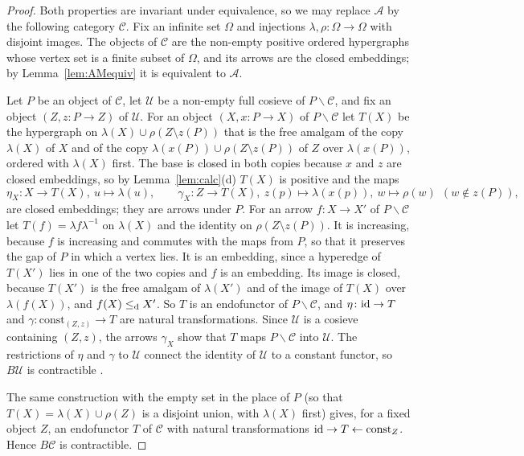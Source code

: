 \begin{proof}
Both properties are invariant under equivalence, so we may replace $\mathcal A$
by the following category $\mathcal C$. Fix an infinite set $\Omega$ and
injections $\lambda,\rho\colon\Omega\to\Omega$ with disjoint images. The objects
of $\mathcal C$ are the non-empty positive ordered hypergraphs whose vertex set
is a finite subset of $\Omega$, and its arrows are the closed embeddings; by
Lemma~\ref{lem:AMequiv} it is equivalent to $\mathcal A$.

Let $P$ be an object of $\mathcal C$, let $\mathcal U$ be a non-empty full
cosieve of $P\backslash\mathcal C$, and fix an object $(Z,z\colon P\to Z)$ of
$\mathcal U$. For an object $(X,x\colon P\to X)$ of $P\backslash\mathcal C$ let
$T(X)$ be the hypergraph on $\lambda(X)\cup\rho(Z\setminus z(P))$ that is the free
amalgam of the copy $\lambda(X)$ of $X$ and of the copy
$\lambda(x(P))\cup\rho(Z\setminus z(P))$ of $Z$ over $\lambda(x(P))$, ordered
with $\lambda(X)$ first. The base is closed in both copies because $x$ and
$z$ are closed embeddings, so by Lemma~\ref{lem:calc}(d) $T(X)$ is positive and
the maps
\[
 \eta_X\colon X\to T(X),\ u\mapsto\lambda(u),\qquad
 \gamma_X\colon Z\to T(X),\ z(p)\mapsto\lambda(x(p)),\ w\mapsto\rho(w)\ \
 (w\notin z(P)),
\]
are closed embeddings; they are arrows under $P$. For an arrow
$f\colon X\to X'$ of $P\backslash\mathcal C$ let
$T(f)=\lambda f\lambda^{-1}$ on $\lambda(X)$ and the identity on
$\rho(Z\setminus z(P))$. It is increasing, because $f$ is increasing and
commutes with the maps from $P$, so that it preserves the gap of $P$ in which a
vertex lies. It is an embedding, since a hyperedge of $T(X')$ lies in one of
the two copies and $f$ is an embedding. Its image is closed, because $T(X')$
is the free amalgam of $\lambda(X')$ and of the image of $T(X)$ over
$\lambda(f(X))$, and $f(X)\leq_{\mathrm{d}} X'$. So $T$ is an endofunctor of
$P\backslash\mathcal C$, and $\eta\colon\mathrm{id}\to T$ and
$\gamma\colon\mathrm{const}_{(Z,z)}\to T$ are natural transformations. Since
$\mathcal U$ is a cosieve containing $(Z,z)$, the arrows $\gamma_X$ show that
$T$ maps $P\backslash\mathcal C$ into $\mathcal U$. The restrictions of $\eta$
and $\gamma$ to $\mathcal U$ connect the identity of $\mathcal U$ to a constant
functor, so $B\mathcal U$ is contractible \cite[IV.3.2]{Kbook}.

The same construction with the empty set in the place of $P$ (so that
$T(X)=\lambda(X)\cup\rho(Z)$ is a disjoint union, with $\lambda(X)$ first)
gives, for a fixed object $Z$, an endofunctor $T$ of $\mathcal C$ with natural
transformations $\mathrm{id}\to T\leftarrow\mathrm{const}_Z$. Hence $B\mathcal C$ is
contractible.
\end{proof}

